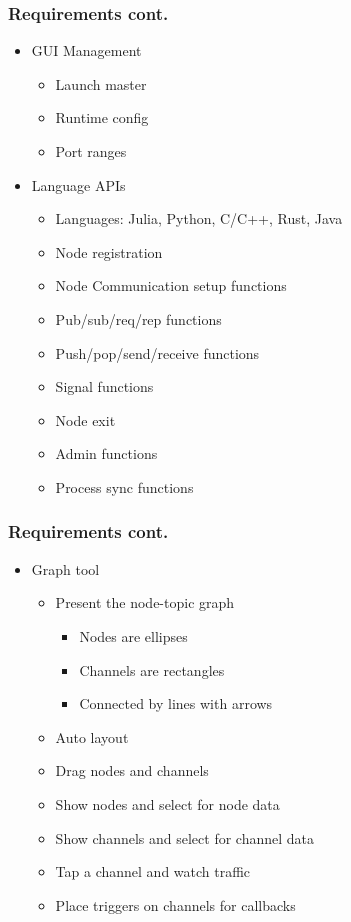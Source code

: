 \documentclass[xcolor=svgnames]{beamer}
\begin{document}
\begin{frame}[fragile]
  \frametitle{Requirements cont.}

\begin{itemize}
\item GUI Management
\begin{itemize}
\item  Launch master
\item  Runtime config
\item  Port ranges
\end{itemize}


\item Language APIs
\begin{itemize}
\item Languages: Julia, Python, C/C++, Rust, Java
\item Node registration 
\item Node Communication setup functions
\item Pub/sub/req/rep  functions
\item Push/pop/send/receive functions
\item Signal functions
\item Node exit
\item Admin functions
\item Process sync functions
\end{itemize}

\end{itemize}
\end{frame}





\begin{frame}[fragile]
  \frametitle{Requirements cont.}

\begin{itemize}
\item Graph tool
\begin{itemize}
\item Present the node-topic graph
\begin{itemize}
\item Nodes are ellipses
\item Channels are rectangles
\item Connected by lines with arrows
\end{itemize}
\item Auto layout
\item Drag nodes and channels
\item Show nodes and select for node data
\item Show channels and select for channel data
\item Tap a channel and watch traffic
\item Place triggers on channels for callbacks
\end{itemize}
\end{itemize}
\end{frame}
\end{document}
